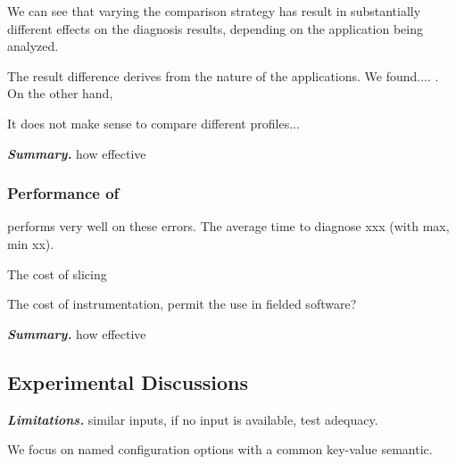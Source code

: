 We can see that varying the comparison strategy has result in
substantially different effects on the diagnosis results,
depending on the application being analyzed.

The result difference derives from the nature of the applications.
We found....  . On the other hand,

It does not make sense to compare different profiles...




\vspace{1mm}
\noindent \textbf{\textit{Summary.}} how effective

\subsubsection{Performance of \ourtool}

\ourtool performs very well on these errors. The average time
to diagnose xxx (with max, min xx).

The cost of slicing

The cost of instrumentation, permit the use in fielded software?




\vspace{1mm}
\noindent \textbf{\textit{Summary.}} how effective

\vspace{1mm}

\subsection{Experimental Discussions}


\noindent \textbf{\textit{Limitations.}} similar inputs, if no input is available, test adequacy.

We focus on named configuration options with a common key-value semantic.

